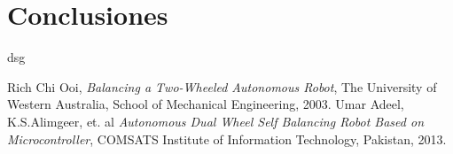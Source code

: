 \documentclass[10pt]{article}
\begin{document}
\section{Conclusiones}
dsg
\begin{thebibliography}{9}

  Rich Chi Ooi,
  \emph{Balancing a Two-Wheeled Autonomous Robot},
  The University of Western Australia, School of Mechanical Engineering,
  2003.
  Umar Adeel, K.S.Alimgeer, et. al
  \emph{Autonomous Dual Wheel Self Balancing Robot Based on Microcontroller},
  COMSATS Institute of Information Technology, Pakistan,
  2013.
\end{thebibliography}
\end{document}
